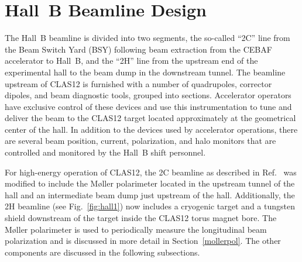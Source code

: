 \section{Hall~B Beamline Design}
\label{beamlinedesign}

The Hall~B beamline is divided into two segments, the so-called ``2C'' line from the Beam Switch Yard (BSY)
following beam extraction from the CEBAF accelerator to Hall~B, and the ``2H'' line from the upstream end
of the experimental hall to the beam dump in the downstream tunnel. The beamline upstream of CLAS12 is
furnished with a number of quadrupoles, corrector dipoles, and beam diagnostic tools, grouped into sections.
Accelerator operators have exclusive control of these devices and use this instrumentation to tune and deliver
the beam to the CLAS12 target located approximately at the geometrical center of the hall. In addition to the
devices used by accelerator operations, there are several beam position, current, polarization, and halo monitors
that are controlled and monitored by the Hall~B shift personnel. 

For high-energy operation of CLAS12, the 2C beamline as described in Ref.~\cite{HPSBeamline} was modified to
include the M{\o}ller polarimeter located in the upstream tunnel of the hall and an intermediate beam dump just
upstream of the hall. Additionally, the 2H beamline (see Fig.~\ref{fig:hall1}) now includes a cryogenic target and a
tungsten shield downstream of the target inside the CLAS12 torus magnet bore. The M{\o}ller polarimeter is used
to periodically measure the longitudinal beam polarization and is discussed in more detail in Section~\ref{mollerpol}.
The other components are discussed in the following subsections.


